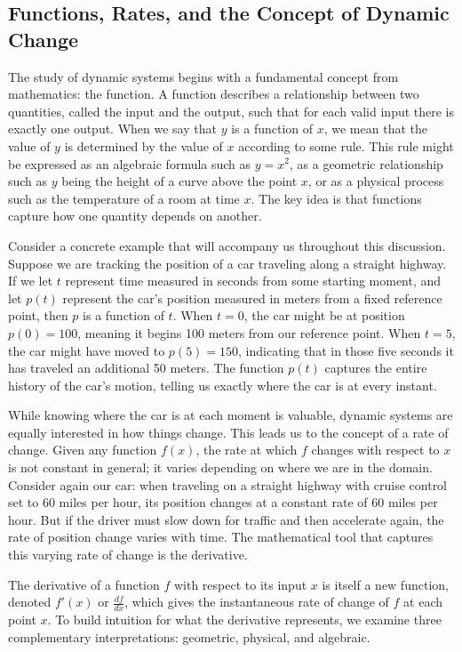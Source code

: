 \subsection{Functions, Rates, and the Concept of Dynamic Change}

The study of dynamic systems begins with a fundamental concept from mathematics: the function. A function describes a relationship between two quantities, called the input and the output, such that for each valid input there is exactly one output. When we say that $y$ is a function of $x$, we mean that the value of $y$ is determined by the value of $x$ according to some rule. This rule might be expressed as an algebraic formula such as $y = x^2$, as a geometric relationship such as $y$ being the height of a curve above the point $x$, or as a physical process such as the temperature of a room at time $x$. The key idea is that functions capture how one quantity depends on another.

Consider a concrete example that will accompany us throughout this discussion. Suppose we are tracking the position of a car traveling along a straight highway. If we let $t$ represent time measured in seconds from some starting moment, and let $p(t)$ represent the car's position measured in meters from a fixed reference point, then $p$ is a function of $t$. When $t = 0$, the car might be at position $p(0) = 100$, meaning it begins 100 meters from our reference point. When $t = 5$, the car might have moved to $p(5) = 150$, indicating that in those five seconds it has traveled an additional 50 meters. The function $p(t)$ captures the entire history of the car's motion, telling us exactly where the car is at every instant.

While knowing where the car is at each moment is valuable, dynamic systems are equally interested in how things change. This leads us to the concept of a rate of change. Given any function $f(x)$, the rate at which $f$ changes with respect to $x$ is not constant in general; it varies depending on where we are in the domain. Consider again our car: when traveling on a straight highway with cruise control set to 60 miles per hour, its position changes at a constant rate of 60 miles per hour. But if the driver must slow down for traffic and then accelerate again, the rate of position change varies with time. The mathematical tool that captures this varying rate of change is the derivative.

The derivative of a function $f$ with respect to its input $x$ is itself a new function, denoted $f'(x)$ or $\frac{df}{dx}$, which gives the instantaneous rate of change of $f$ at each point $x$. To build intuition for what the derivative represents, we examine three complementary interpretations: geometric, physical, and algebraic.

